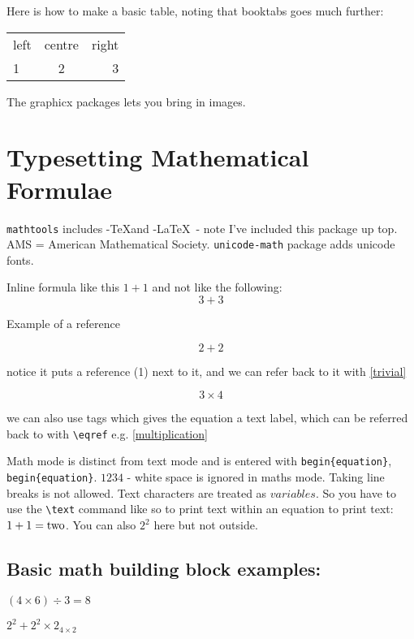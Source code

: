 \documentclass{article}
\begin{document}
Here is how to make a basic table, noting that booktabs goes much further:

\begin{tabular}{lcr}
left & centre & right \\
1 & 2 & 3 \\
\end{tabular}

The graphicx packages lets you bring in images.

\section{Typesetting Mathematical
Formulae}

\verb|mathtools| includes \AmS-\TeX and \AmS-\LaTeX \ - note I've included this package up top. AMS = American Mathematical Society. \verb|unicode-math| package adds unicode fonts.

Inline formula like this \(1 + 1\) and not like the following: \[3 + 3\]

Example of a reference

\begin{equation}
\label{trivial}
2 + 2
\end{equation}

notice it puts a reference (1) next to it, and we can refer back to it with \ref{trivial}

\begin{equation}
\label{multiplication}
\tag{simple equation}
3 \times 4
\end{equation}

we can also use tags which gives the equation a text label, which can be referred back to with \verb|\eqref| e.g. \eqref{multiplication}

Math mode is distinct from text mode and is entered with \verb|begin{equation}|, \verb|begin{equation}|. \(1 2 3 4\) - white space is ignored in maths mode. Taking line breaks is not allowed. Text characters are treated as \(variables\). So you have to use the \verb|\text| command like so to print text within an equation to print text: \( \text1+ 1 = \text{two}\). You can also \(2^2\) here but not outside.

\subsection{Basic math building block examples:}

\((4 \times 6) \div 3 = 8 \)

\(2^2 + 2^2 \times 2_{4 \times 2}\)
\end{document}
